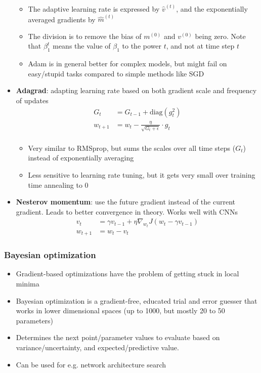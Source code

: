 \begin{itemize}
\begin{itemize}
		\item The adaptive learning rate is expressed by $\hat{v}^{(t)}$, and the exponentially averaged gradients by $\hat{m}^{(t)}$
		\item The division is to remove the bias of $m^{(0)}$ and $v^{(0)}$ being zero. Note that $\beta_1^t$ means the value of $\beta_1$ to the power $t$, and not at time step $t$
		\item Adam is in general better for complex models, but might fail on easy/stupid tasks compared to simple methods like SGD
	\end{itemize}
	\item \textbf{Adagrad}: adapting learning rate based on both gradient scale and frequency of updates
	\begin{equation*}
		\begin{split}
			G_t & = G_{t-1} + \text{diag}\left(g_t^2\right)\\
			w_{t+1} & = w_{t} - \frac{\eta}{\sqrt{G_t + \epsilon}}\cdot g_t\\
		\end{split}
	\end{equation*}
	\begin{itemize}
		\item Very similar to RMSprop, but sums the scales over all time steps ($G_t$) instead of exponentially averaging 
		\item Less sensitive to learning rate tuning, but it gets very small over training time annealing to 0
	\end{itemize} 
	\item \textbf{Nesterov momentum}: use the future gradient instead of the current gradient. Leads to better convergence in theory. Works well with CNNs
	\begin{equation*}
		\begin{split}
			v_t &= \gamma v_{t-1} + \eta \nabla_{w_t} J(w_t - \gamma v_{t-1}) \\
			w_{t+1} &= w_t - v_t
		\end{split}
	\end{equation*}
\end{itemize}
\subsubsection{Bayesian optimization}
\begin{itemize}
	\item Gradient-based optimizations have the problem of getting stuck in local minima
	\item Bayesian optimization is a gradient-free, educated trial and error guesser that works in lower dimensional spaces (up to 1000, but mostly 20 to 50 parameters)
	\item Determines the next point/parameter values to evaluate based on variance/uncertainty, and expected/predictive value. 
	\item Can be used for e.g. network architecture search
\end{itemize}
